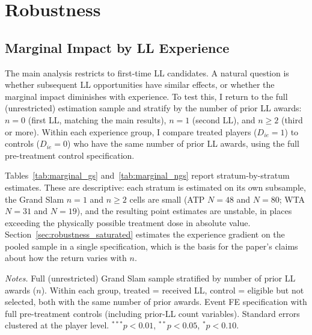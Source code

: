 \section{Robustness}
\label{sec:robustness}

\subsection{Marginal Impact by LL Experience}
\label{sec:robustness_marginal}

The main analysis restricts to first-time LL candidates. A natural question is whether subsequent LL opportunities have similar effects, or whether the marginal impact diminishes with experience. To test this, I return to the full (unrestricted) estimation sample and stratify by the number of prior LL awards: $n = 0$ (first LL, matching the main results), $n = 1$ (second LL), and $n \geq 2$ (third or more). Within each experience group, I compare treated players ($D_{ie} = 1$) to controls ($D_{ie} = 0$) who have the same number of prior LL awards, using the full pre-treatment control specification.

Tables~\ref{tab:marginal_gs} and~\ref{tab:marginal_ngs} report stratum-by-stratum estimates. These are descriptive: each stratum is estimated on its own subsample, the Grand Slam $n = 1$ and $n \geq 2$ cells are small (ATP $N = 48$ and $N = 80$; WTA $N = 31$ and $N = 19$), and the resulting point estimates are unstable, in places exceeding the physically possible treatment dose in absolute value. Section~\ref{sec:robustness_saturated} estimates the experience gradient on the pooled sample in a single specification, which is the basis for the paper's claims about how the return varies with $n$.

\begin{table}[htbp]
\centering
\caption{Marginal Impact by LL Experience: Grand Slam Samples}
\label{tab:marginal_gs}
\begin{threeparttable}
\scriptsize

\begin{tablenotes}
\footnotesize
\item \textit{Notes.} Full (unrestricted) Grand Slam sample stratified by number of prior LL awards ($n$). Within each group, treated = received LL, control = eligible but not selected, both with the same number of prior awards. Event FE specification with full pre-treatment controls (including prior-LL count variables). Standard errors clustered at the player level. $^{***}p<0.01$, $^{**}p<0.05$, $^{*}p<0.10$.
\end{tablenotes}
\end{threeparttable}
\end{table}

